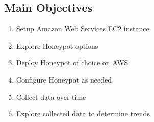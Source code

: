 \documentclass[a0,landscape]{a0poster}
\begin{document}
\begin{multicols}{3} %


\color{Black} %

	

\color{Black} %

\section*{Main Objectives}

\begin{enumerate}
\item Setup Amazon Web Services EC2 instance
\item Explore Honeypot options
\item Deploy Honeypot of choice on AWS
\item Configure Honeypot as needed
\item Collect data over time
\item Explore collected data to determine trends
\end{enumerate}



\end{multicols}
\end{document}
